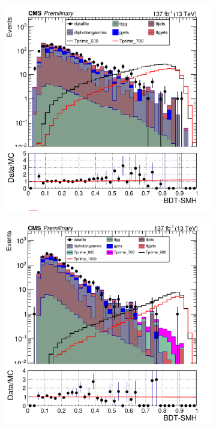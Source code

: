 \begin{figure}
     \centering
     \begin{subfigure}[b]{0.3\textwidth}
         \centering
         \includegraphics[width=\textwidth]{BDT_Output/Stacked_plot_BDT_600-700_with_diphoton_cuts_with_scaled_inputs.pdf}
         \label{fig:y equals x}
     \end{subfigure}
     \hfill
     \begin{subfigure}[b]{0.3\textwidth}
         \centering
         \includegraphics[width=\textwidth]{BDT_Output/Stacked_plot_BDT_800-1000_with_diphoton_cuts_with_Scaled_inputs.pdf}

\end{subfigure}
\end{figure}

